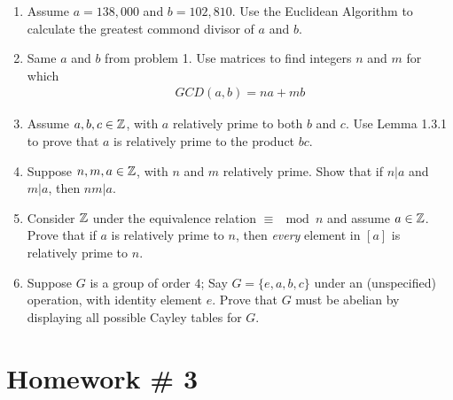 \begin{enumerate}
    \item Assume $a=138,000$ and $b=102,810$. Use the Euclidean Algorithm to calculate the greatest commond divisor of $a$ and $b$. \\ \steezybreak
    
    \item Same $a$ and $b$ from problem 1. Use matrices to find integers $n$ and $m$ for which
    \begin{align}
        GCD(a,b)=na+mb \nonumber
    \end{align}
    \item Assume $a,b,c\in {\mathbb{ Z}}$, with $a$ relatively prime to both $b$ and $c$. Use Lemma 1.3.1 to prove that $a$ is relatively prime to the product $bc$. \\ \steezybreak

    \item Suppose $n,m,a \in {\mathbb{ Z}}$, with $n$ and $m$ relatively prime. Show that if $n|a$ and $m|a$, then $nm|a$. \\ \steezybreak
    
    \item Consider ${\mathbb{ Z}}$ under the equivalence relation $\equiv \mod n$ and assume $a\in {\mathbb{ Z}}$. Prove that if $a$ is relatively prime to $n$, then \textit{every} element in $[a]$ is relatively prime to $n$. \\ \steezybreak
    
    \item Suppose $G$ is a group of order $4$; Say $G=\{e,a,b,c\}$ under an (unspecified) operation, with identity element $e$. Prove that $G$ must be abelian by displaying all possible Cayley tables for $G$.
\end{enumerate}
\newpage

\section*{Homework \# 3}
\label{sec:HW3}

